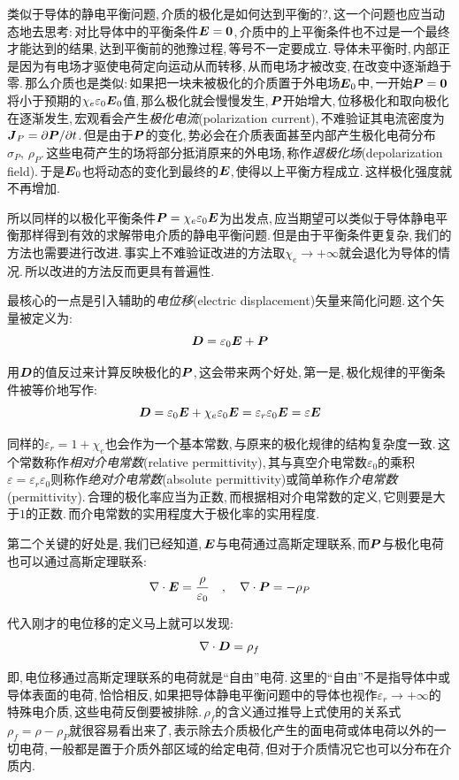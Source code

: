 类似于导体的静电平衡问题,\,介质的极化是如何达到平衡的?,\,这一个问题也应当动态地去思考:\,对比导体中的平衡条件$\boldsymbol{E}=\boldsymbol{0}$,\,介质中的上平衡条件也不过是一个最终才能达到的结果,\,达到平衡前的弛豫过程,\,等号不一定要成立.\,导体未平衡时,\,内部正是因为有电场才驱使电荷定向运动从而转移,\,从而电场才被改变,\,在改变中逐渐趋于零.\,那么介质也是类似:\,如果把一块未被极化的介质置于外电场$\boldsymbol{E}_0$中,\,一开始$\boldsymbol{P}=\boldsymbol{0}$将小于预期的$\chi_e \varepsilon_0 \boldsymbol{E}_0$值,\,那么极化就会慢慢发生,\,$\boldsymbol{P}$开始增大,\,位移极化和取向极化在逐渐发生,\,宏观看会产生\emph{极化电流}(polarization current),\,不难验证其电流密度为$\boldsymbol{J}_P=\partial \boldsymbol{P}/\partial t$.\,但是由于$\boldsymbol{P}$的变化,\,势必会在介质表面甚至内部产生极化电荷分布$\sigma_P,\,\rho_P$.\,这些电荷产生的场将部分抵消原来的外电场,\,称作\emph{退极化场}(depolarization field).\,于是$\boldsymbol{E}_0$也将动态的变化到最终的$\boldsymbol{E}$,\,使得以上平衡方程成立.\,这样极化强度就不再增加.

所以同样的以极化平衡条件$\boldsymbol{P}=\chi_e \varepsilon_0 \boldsymbol{E}$为出发点,\,应当期望可以类似于导体静电平衡那样得到有效的求解带电介质的静电平衡问题.\,但是由于平衡条件更复杂,\,我们的方法也需要进行改进.\,事实上不难验证改进的方法取$\chi_e\to+ \infty$就会退化为导体的情况.\,所以改进的方法反而更具有普遍性.

最核心的一点是引入辅助的\emph{电位移}(electric displacement)矢量来简化问题.\,这个矢量被定义为:
\[\boldsymbol{D}=\varepsilon_0 \boldsymbol{E}+\boldsymbol{P}\]

用$\boldsymbol{D}$的值反过来计算反映极化的$\boldsymbol{P}$,\,这会带来两个好处,\,第一是,\,极化规律的平衡条件被等价地写作:
\[\boldsymbol{D}=\varepsilon_0 \boldsymbol{E}+\chi_e \varepsilon_0 \boldsymbol{E}=\varepsilon_r \varepsilon_0 \boldsymbol{E}=\varepsilon \boldsymbol{E}\]

同样的$\varepsilon_r=1+\chi_e$也会作为一个基本常数,\,与原来的极化规律的结构复杂度一致.\,这个常数称作\emph{相对介电常数}(relative permittivity),\,其与真空介电常数$\varepsilon_0$的乘积$\varepsilon=\varepsilon_r \varepsilon_0$则称作\emph{绝对介电常数}(absolute permittivity)或简单称作\emph{介电常数}(permittivity).\,合理的极化率应当为正数,\,而根据相对介电常数的定义,\,它则要是大于$1$的正数.\,而介电常数的实用程度大于极化率的实用程度.

第二个关键的好处是,\,我们已经知道,\,$\boldsymbol{E}$与电荷通过高斯定理联系,\,而$\boldsymbol{P}$与极化电荷也可以通过高斯定理联系:
\[\nabla\cdot \boldsymbol{E}=\frac{\rho}{\varepsilon_0}\quad ,\quad \nabla\cdot \boldsymbol{P}=-\rho_P\]

代入刚才的电位移的定义马上就可以发现:
\[\nabla \cdot \boldsymbol{D}=\rho_f\]

即,\,电位移通过高斯定理联系的电荷就是``自由''电荷.\,这里的``自由''不是指导体中或导体表面的电荷,\,恰恰相反,\,如果把导体静电平衡问题中的导体也视作$\varepsilon_r\to+ \infty$的特殊电介质,\,这些电荷反倒要被排除.\,$\rho_f$的含义通过推导上式使用的关系式$\rho_f=\rho-\rho_P$就很容易看出来了,\,表示除去介质极化产生的面电荷或体电荷以外的一切电荷,\,一般都是置于介质外部区域的给定电荷,\,但对于介质情况它也可以分布在介质内.


